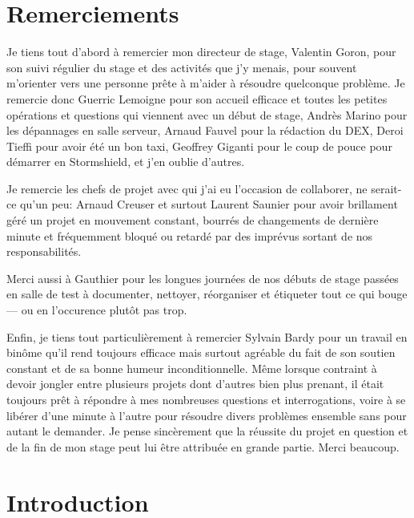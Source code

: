 \documentclass[12pt, oneside, a4paper, titlepage]{report}
\begin{document}
\begin{titlepage}
    
\end{titlepage}

\tableofcontents




\chapter{Remerciements}%
\label{cha:ackn}

Je tiens tout d'abord à remercier mon directeur de stage, Valentin Goron, pour
son suivi régulier du stage et des activités que j'y menais, pour souvent
m'orienter vers une personne prête à m'aider à résoudre quelconque problème. Je
remercie donc Guerric Lemoigne pour son accueil efficace et toutes les petites
opérations et questions qui viennent avec un début de stage, Andrès Marino pour
les dépannages en salle serveur, Arnaud Fauvel pour la rédaction du DEX, Deroi
Tieffi pour avoir été un bon taxi, Geoffrey Giganti pour le coup de pouce pour
démarrer en Stormshield, et j'en oublie d'autres.

Je remercie les chefs de projet avec qui j'ai eu l'occasion de collaborer, ne
serait-ce qu'un peu: Arnaud Creuser et surtout Laurent Saunier pour avoir
brillament géré un projet en mouvement constant, bourrés de changements de
dernière minute et fréquemment bloqué ou retardé par des imprévus sortant de nos
responsabilités.

Merci aussi à Gauthier pour les longues journées de nos débuts de stage passées
en salle de test à documenter, nettoyer, réorganiser et étiqueter tout ce qui
bouge --- ou en l'occurence plutôt pas trop.

Enfin, je tiens tout particulièrement à remercier Sylvain Bardy pour un travail
en binôme qu'il rend toujours efficace mais surtout agréable du fait de son
soutien constant et de sa bonne humeur inconditionnelle. Même lorsque contraint
à devoir jongler entre plusieurs projets dont d'autres bien plus prenant, il
était toujours prêt à répondre à mes nombreuses questions et interrogations,
voire à se libérer d'une minute à l'autre pour résoudre divers problèmes
ensemble sans pour autant le demander. Je pense sincèrement que la réussite du
projet en question et de la fin de mon stage peut lui être attribuée en grande
partie. Merci beaucoup.


\chapter{Introduction}%
\label{cha:intro}
\end{document}
